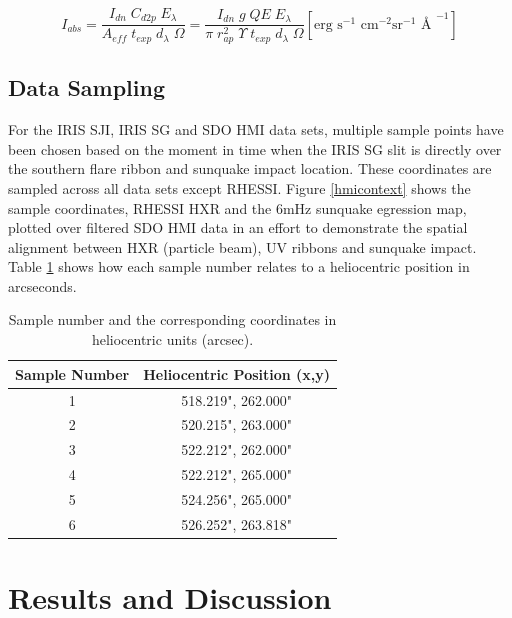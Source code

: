 \begin{equation}\label{hmiradiometriccal}
I_{abs} = \frac{I_{dn} \; C_{d2p} \; E_{\lambda}}{A_{eff} \; t_{exp} \; d_{\lambda} \; \Omega} 
        = \frac{I_{dn} \; g \; QE \; E_{\lambda}}{\pi \; r_{ap}^{2} \; \Upsilon \; t_{exp} \; d_{\lambda} \; \Omega} [\text{erg s}^{-1}\text{ cm}^{-2}\text{sr}^{-1}\text{ \AA\ }^{-1}]
\end{equation}


\subsection{Data Sampling}
For the IRIS SJI, IRIS SG and SDO HMI data sets, multiple sample points have been chosen based on the moment in time when the IRIS SG slit is directly over the southern flare ribbon and sunquake impact location. These coordinates are sampled across all data sets except RHESSI. Figure \ref{hmicontext} shows the sample coordinates, RHESSI HXR and the 6mHz sunquake egression map, plotted over filtered SDO HMI data in an effort to demonstrate the spatial alignment between HXR (particle beam), UV ribbons and sunquake impact. Table \ref{coordtab} shows how each sample number relates to a heliocentric position in arcseconds.


\begin{table}[h]

\begin{tabular}{|c|c|}
\hline
Sample Number & Heliocentric Position (x,y)\\
\hline
1 & 518.219", 262.000"\\
2 & 520.215", 263.000"\\
3 & 522.212", 262.000"\\
4 & 522.212", 265.000"\\
5 & 524.256", 265.000"\\
6 & 526.252", 263.818"\\
\hline
\end{tabular}
\caption{Sample number and the corresponding coordinates in heliocentric units (arcsec).}\label{coordtab}
\end{table}


\section{Results and Discussion}


